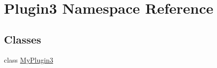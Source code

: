 \hypertarget{namespace_plugin3}{\section{\-Plugin3 \-Namespace \-Reference}
\label{namespace_plugin3}
}
\subsection*{\-Classes}
\begin{DoxyCompactItemize}
\item 
class \hyperlink{class_plugin3_1_1_my_plugin3}{\-My\-Plugin3}
\end{DoxyCompactItemize}
